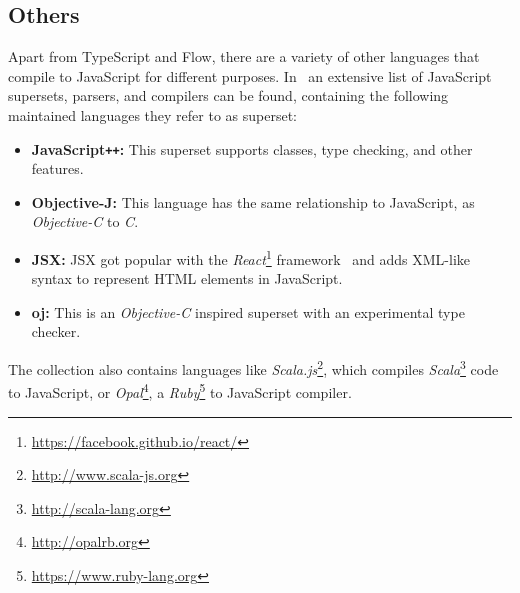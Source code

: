 \subsection{Others}
\label{sec:other-supersets}

%


Apart from TypeScript and Flow, there are a variety of other languages that compile to JavaScript for different purposes. In~\cite{LanguagesThatCompileToJS:CoffeeScript} an extensive list of JavaScript supersets, parsers, and compilers can be found, containing the following maintained languages they refer to as superset:
\begin{itemize}
  \item \textbf{JavaScript\texttt{++}:} This superset supports classes, type checking, and other features.
  \item \textbf{Objective-J:} This language has the same relationship to JavaScript, as \emph{Objective-C} to \emph{C}.
  \item \textbf{JSX:} JSX got popular with the \emph{React}\footnote{\url{https://facebook.github.io/react/}} framework~\cite{TypeScriptHandbook:JSX} and adds XML-like syntax to represent HTML elements in JavaScript.
  \item \textbf{oj:} This is an \emph{Objective-C} inspired superset with an experimental type checker.
\end{itemize}
The collection also contains languages like \emph{Scala.js}\footnote{\url{http://www.scala-js.org}}, which compiles \emph{Scala}\footnote{\url{http://scala-lang.org}} code to JavaScript, or \emph{Opal}\footnote{\url{http://opalrb.org}}, a \emph{Ruby}\footnote{\url{https://www.ruby-lang.org}} to JavaScript compiler.

